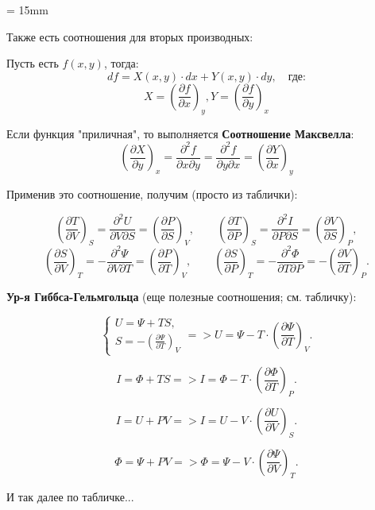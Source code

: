 \documentclass[11pt,a4paper,oneside]{article} %
\newcommand{\deriv}[3]{ \left( \frac{\partial #1}{\partial #2} \right) _{#3} }
\begin{document}
    \leftskip = 15mm

    \begin{center}
        \Large
        Также есть соотношения для вторых производных:
    \end{center}

    Пусть есть $ f (x, y) $, тогда:
    $$ df = X(x, y) \cdot dx + Y(x, y) \cdot dy , \quad \texttt {где:} $$  $$ X = \deriv{f}{x}{y}, Y = \deriv{f}{y}{x} $$

    Если функция "приличная", то выполняется \textbf {Соотношение Максвелла}:
    $$ \deriv{X}{y}{x} = \frac{\partial^2f}{\partial x \partial y} = \frac{\partial^2f}{\partial y \partial x} = \deriv{Y}{x}{y} $$

    Применив это соотношение, получим (просто из таблички):

    $$ \deriv{T}{V}{S} = \frac{\partial^2U}{\partial V \partial S} = \deriv{P}{S}{V}, \qquad
       \deriv{T}{P}{S} = \frac{\partial^2I}{\partial P \partial S} = \deriv{V}{S}{P}, $$
    $$ \deriv{S}{V}{T} = -\frac{\partial^2\Psi}{\partial V \partial T} = \deriv{P}{T}{V}, \qquad
       \deriv{S}{P}{T} = -\frac{\partial^2\Phi}{\partial T \partial P} = -\deriv{V}{T}{P}. $$

\newpage

    \begin{center}
        \Large
        \textbf {Ур-я Гиббса-Гельмгольца} (еще полезные соотношения; см. табличку):
    \end{center}

    $$ \begin{cases} U = \Psi + TS, \\ S = -\deriv{\Psi}{T}{V} \end{cases} =>
       U = \Psi - T \cdot \deriv{\Psi}{T}{V}. $$

    $$ I = \Phi + TS =>
       I = \Phi - T \cdot \deriv{\Phi}{T}{P}. $$

    $$ I = U + PV =>
       I = U - V \cdot \deriv{U}{V}{S}. $$

    $$ \Phi = \Psi + PV =>
       \Phi = \Psi - V \cdot \deriv{\Psi}{V}{T}. $$

    \begin{center}
        И так далее по табличке...
    \end{center}
\end{document}
